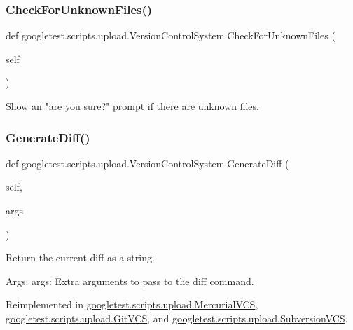 \subsubsection{\texorpdfstring{CheckForUnknownFiles()}{CheckForUnknownFiles()}}
{\footnotesize\ttfamily def googletest.\+scripts.\+upload.\+Version\+Control\+System.\+Check\+For\+Unknown\+Files (\begin{DoxyParamCaption}\item[{}]{self }\end{DoxyParamCaption})}

\begin{DoxyVerb}Show an "are you sure?" prompt if there are unknown files.\end{DoxyVerb}
 \mbox{\label{classgoogletest_1_1scripts_1_1upload_1_1_version_control_system_aaada7d567809eca22e4a9ddd377429fe}} 
\subsubsection{\texorpdfstring{GenerateDiff()}{GenerateDiff()}}
{\footnotesize\ttfamily def googletest.\+scripts.\+upload.\+Version\+Control\+System.\+Generate\+Diff (\begin{DoxyParamCaption}\item[{}]{self,  }\item[{}]{args }\end{DoxyParamCaption})}

\begin{DoxyVerb}Return the current diff as a string.

Args:
  args: Extra arguments to pass to the diff command.
\end{DoxyVerb}
 

Reimplemented in \mbox{\hyperlink{classgoogletest_1_1scripts_1_1upload_1_1_mercurial_v_c_s_a14f6e335314bd90e0af5bfaf13614700}{googletest.\+scripts.\+upload.\+Mercurial\+V\+CS}}, \mbox{\hyperlink{classgoogletest_1_1scripts_1_1upload_1_1_git_v_c_s_a0f17ec6f907aa737ac9b7c5d06f85884}{googletest.\+scripts.\+upload.\+Git\+V\+CS}}, and \mbox{\hyperlink{classgoogletest_1_1scripts_1_1upload_1_1_subversion_v_c_s_aec042415e243ba61d29c70540dcc8d87}{googletest.\+scripts.\+upload.\+Subversion\+V\+CS}}.

